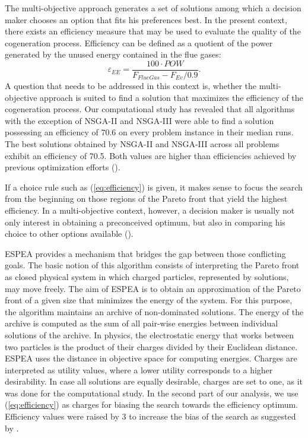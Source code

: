 The multi-objective approach generates a set of solutions among which a decision maker chooses an option that fits his preferences best. In the present context, there exists an efficiency measure that may be used to evaluate the quality of the cogeneration process. Efficiency can be defined as a quotient of the power generated by the unused energy contained in the flue gases:
%
\begin{equation}
\label{eq:efficiency}
\varepsilon_{EE} = \frac{100 \cdot POW}{F_{FlueGas} - F_{Ev}/0.9}.
\end{equation}
%
A question that needs to be addressed in this context is, whether the multi-objective approach is suited to find a solution that maximizes the efficiency of the cogeneration process. Our computational study has revealed that all algorithms with the exception of NSGA-II and NSGA-III were able to find a solution possessing an efficiency of 70.6 on every problem instance in their median runs. The best solutions obtained by NSGA-II and NSGA-III across all problems exhibit an efficiency of 70.5. Both values are higher than efficiencies achieved by previous optimization efforts (\cite{Seijo2016309}).

If a choice rule such as (\ref{eq:efficiency}) is given, it makes sense to focus the search from the beginning on those regions of the Pareto front that yield the highest efficiency. In a multi-objective context, however, a decision maker is usually not only interest in obtaining a preconceived optimum, but also in comparing his choice to other options available (\cite{roy1996multicriteria,kahneman1979prospect}).

ESPEA provides a mechanism that bridges the gap between those conflicting goals. The basic notion of this algorithm consists of interpreting the Pareto front as closed physical system in which charged particles, represented by solutions, may move freely. The aim of ESPEA is to obtain an approximation of the Pareto front of a given size that minimizes the energy of the system. For this purpose, the algorithm maintains an archive of non-dominated solutions. The energy of the archive is computed as the sum of all pair-wise energies between individual solutions of the archive. In physics, the electrostatic energy that works between two particles is the product of their charges divided by their Euclidean distance. ESPEA uses the distance in objective space for computing energies. Charges are interpreted as utility values, where a lower utility corresponds to a higher desirability. In case all solutions are equally desirable, charges are set to one, as it was done for the computational study. In the second part of our analysis, we use (\ref{eq:efficiency}) as charges for biasing the search towards the efficiency optimum. Efficiency values were raised by 3 to increase the bias of the search as suggested by \cite{espea}.



